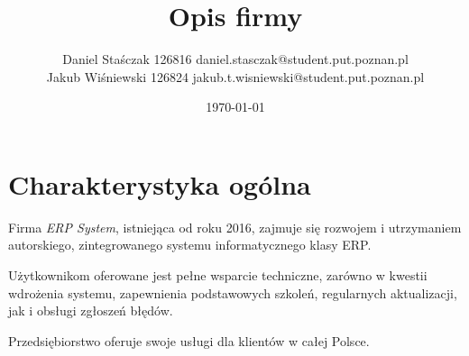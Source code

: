 \documentclass{article}
\title{Opis firmy \insertcompanyname}
\author{
    Daniel Staśczak 126816 daniel.stasczak@student.put.poznan.pl
    \\
    Jakub Wiśniewski 126824 jakub.t.wisniewski@student.put.poznan.pl
}
\date{\today}
\newcommand{\insertcompanyname}{\textit{ERP System}}
\begin{document}
    \maketitle

    \newpage
    \tableofcontents
    \listoffigures
    \listoftables

    \newpage
    \section{Charakterystyka ogólna}
        Firma \insertcompanyname, istniejąca od roku 2016, zajmuje się rozwojem i utrzymaniem autorskiego, zintegrowanego systemu informatycznego klasy ERP.

        Użytkownikom oferowane jest pełne wsparcie techniczne, zarówno w kwestii wdrożenia systemu, zapewnienia podstawowych szkoleń, regularnych aktualizacji, jak i obsługi zgłoszeń błędów.

        Przedsiębiorstwo oferuje swoje usługi dla klientów w całej Polsce.

    \newpage
\end{document}

